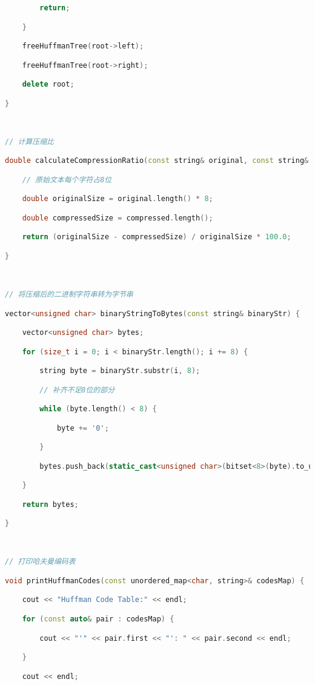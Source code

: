 \begin{lstlisting}[language=C++]
        return;

    }

    freeHuffmanTree(root->left);

    freeHuffmanTree(root->right);

    delete root;

}

  

// 计算压缩比

double calculateCompressionRatio(const string& original, const string& compressed) {

    // 原始文本每个字符占8位

    double originalSize = original.length() * 8;

    double compressedSize = compressed.length();

    return (originalSize - compressedSize) / originalSize * 100.0;

}

  

// 将压缩后的二进制字符串转为字节串

vector<unsigned char> binaryStringToBytes(const string& binaryStr) {

    vector<unsigned char> bytes;

    for (size_t i = 0; i < binaryStr.length(); i += 8) {

        string byte = binaryStr.substr(i, 8);

        // 补齐不足8位的部分

        while (byte.length() < 8) {

            byte += '0';

        }

        bytes.push_back(static_cast<unsigned char>(bitset<8>(byte).to_ulong()));

    }

    return bytes;

}

  

// 打印哈夫曼编码表

void printHuffmanCodes(const unordered_map<char, string>& codesMap) {

    cout << "Huffman Code Table:" << endl;

    for (const auto& pair : codesMap) {

        cout << "'" << pair.first << "': " << pair.second << endl;

    }

    cout << endl;


\end{lstlisting}
